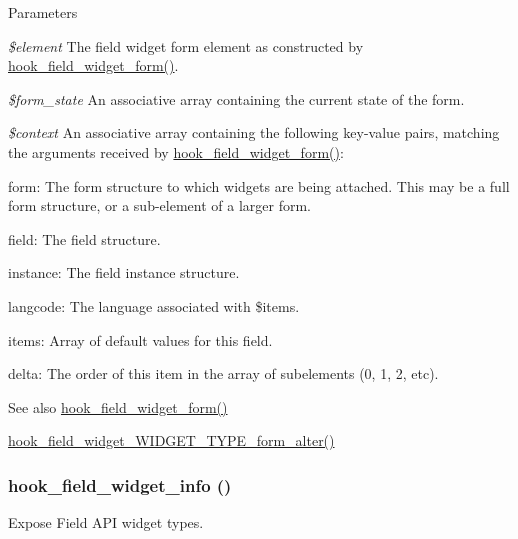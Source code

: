 \begin{DoxyParams}{Parameters}
\item[{\em \$element}]The field widget form element as constructed by \hyperlink{group__field__widget_gaa9b0e55fd0eb57ac0f9c7c30d251971b}{hook\_\-field\_\-widget\_\-form()}. \item[{\em \$form\_\-state}]An associative array containing the current state of the form. \item[{\em \$context}]An associative array containing the following key-\/value pairs, matching the arguments received by \hyperlink{group__field__widget_gaa9b0e55fd0eb57ac0f9c7c30d251971b}{hook\_\-field\_\-widget\_\-form()}:
\begin{DoxyItemize}
\item form: The form structure to which widgets are being attached. This may be a full form structure, or a sub-\/element of a larger form.
\item field: The field structure.
\item instance: The field instance structure.
\item langcode: The language associated with \$items.
\item items: Array of default values for this field.
\item delta: The order of this item in the array of subelements (0, 1, 2, etc).
\end{DoxyItemize}\end{DoxyParams}
\begin{DoxySeeAlso}{See also}
\hyperlink{group__field__widget_gaa9b0e55fd0eb57ac0f9c7c30d251971b}{hook\_\-field\_\-widget\_\-form()} 

\hyperlink{group__field__widget_ga6f53f1874a16e18c27dcc0cc4e7c1ec6}{hook\_\-field\_\-widget\_\-WIDGET\_\-TYPE\_\-form\_\-alter()} 
\end{DoxySeeAlso}
\hypertarget{group__field__widget_gac53aa6c2a4ac1215660d25b5d7f20792}{
\subsubsection[{hook\_\-field\_\-widget\_\-info}]{\setlength{\rightskip}{0pt plus 5cm}hook\_\-field\_\-widget\_\-info ()}}
\label{group__field__widget_gac53aa6c2a4ac1215660d25b5d7f20792}
Expose Field API widget types.

